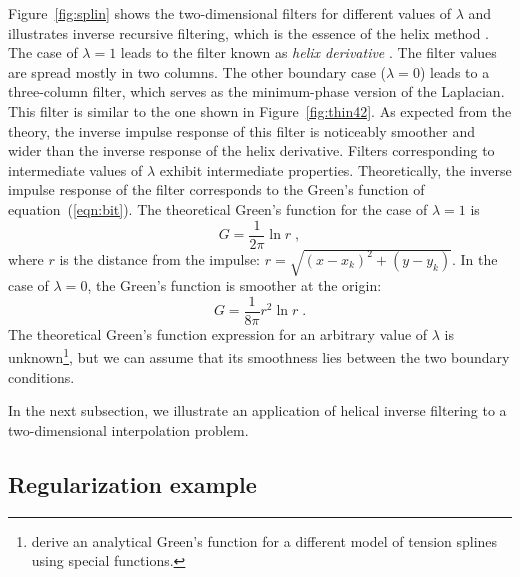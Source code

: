 \par
Figure~\ref{fig:splin} shows the two-dimensional filters for different
values of $\lambda$ and illustrates inverse recursive filtering, which
is the essence of the helix method \cite{helix}. The case of
$\lambda=1$ leads to the filter known as \emph{helix derivative}
\cite{iee}.  The filter values are spread mostly in two columns. The
other boundary case ($\lambda=0$) leads to a three-column filter,
which serves as the minimum-phase version of the Laplacian. This
filter is similar to the one shown in Figure~\ref{fig:thin42}.  As
expected from the theory, the inverse impulse response of this filter
is noticeably smoother and wider than the inverse response of the
helix derivative.  Filters corresponding to intermediate values of
$\lambda$ exhibit intermediate properties.  Theoretically, the inverse
impulse response of the filter corresponds to the Green's function of
equation~(\ref{eqn:bit}). The theoretical Green's function for the
case of $\lambda=1$ is
\begin{equation}
  \label{eqn:g1}
  G = \frac{1}{2\pi}\ln{r}\;,
\end{equation}
where $r$ is the distance from the impulse:
$r=\sqrt{\left(x-x_k\right)^2 + \left(y-y_k\right)}$. In the case of
$\lambda=0$, the Green's function is smoother at the origin:
\begin{equation}
  \label{eqn:g2}
  G = \frac{1}{8\pi}r^2\ln{r}\;.
\end{equation}
The theoretical Green's function expression for an arbitrary value of
$\lambda$ is unknown\footnote{ derive an analytical Green's
  function for a different model of tension splines using special functions.}, 
but we can assume that its smoothness lies
between the two boundary conditions.
\par
In the next subsection, we illustrate an application of helical inverse
filtering to a two-dimensional interpolation problem.

\subsection{Regularization example}

